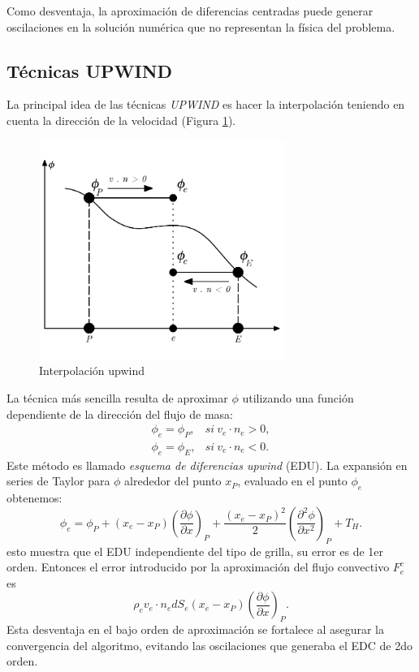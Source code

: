 \documentclass[a4paper,10pt, oneside]{book}
\begin{document}
Como desventaja, la aproximación de diferencias centradas puede generar oscilaciones en la solución numérica que no representan la física del problema.

\subsection{Técnicas UPWIND}

La principal idea de las técnicas \textit{UPWIND} es hacer la interpolación teniendo en cuenta la dirección de la velocidad (Figura \ref{img:4-10}).
\begin{figure}[h!]
	\centering
	\includegraphics[width=8cm]{Img/4-10}
	\caption{Interpolación upwind}
	\label{img:4-10}
\end{figure}
La técnica más sencilla resulta de aproximar $\phi$ utilizando una función dependiente de la dirección del flujo de masa:
\begin{eqnarray}
	\phi_e = \phi_P, & si \ v_e \cdot n_e > 0, \nonumber \\ 
	\phi_e = \phi_E, & si \ v_e \cdot n_e < 0. \nonumber
\end{eqnarray}
Este método es llamado \textit{esquema de diferencias upwind} (EDU). La expansión en series de Taylor para $\phi$ alrededor del punto $x_P$, evaluado en el punto $\phi_e$ obtenemos:
\begin{equation}
	\phi_e = \phi_P + (x_e-x_P) \left( \frac{\partial \phi}{\partial x} \right)_P + \frac{(x_e-x_P)^2}{2} \left( \frac{\partial^2 \phi}{\partial x^2} \right)_P + T_H. \nonumber
\end{equation}
esto muestra que el EDU independiente del tipo de grilla, su error es de 1er orden. Entonces el error introducido por la aproximación del flujo convectivo $F^c_e$ es
\begin{equation}
	\rho_e v_e \cdot n_e dS_e (x_e -x_P) \left( \frac{\partial \phi}{\partial x} \right)_P. \nonumber
\end{equation}
Esta desventaja en el bajo orden de aproximación se fortalece al asegurar la convergencia del algoritmo, evitando las oscilaciones que generaba el EDC de 2do orden. 
\end{document}

